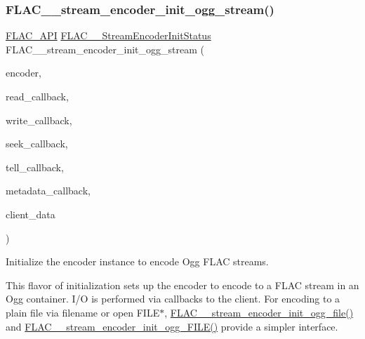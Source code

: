 \subsubsection{\texorpdfstring{FLAC\_\_stream\_encoder\_init\_ogg\_stream()}{FLAC\_\_stream\_encoder\_init\_ogg\_stream()}}
{\footnotesize\ttfamily \mbox{\hyperlink{group__flac__export_ga56ca07df8a23310707732b1c0007d6f5}{F\+L\+A\+C\+\_\+\+A\+PI}} \mbox{\hyperlink{group__flac__stream__encoder_ga3bb869620af2b188d77982a5c30b047d}{F\+L\+A\+C\+\_\+\+\_\+\+Stream\+Encoder\+Init\+Status}} F\+L\+A\+C\+\_\+\+\_\+stream\+\_\+encoder\+\_\+init\+\_\+ogg\+\_\+stream (\begin{DoxyParamCaption}\item[{\mbox{\hyperlink{struct_f_l_a_c_____stream_encoder}{F\+L\+A\+C\+\_\+\+\_\+\+Stream\+Encoder}} $\ast$}]{encoder,  }\item[{\mbox{\hyperlink{group__flac__stream__encoder_ga18b7941b93bae067192732e913536d44}{F\+L\+A\+C\+\_\+\+\_\+\+Stream\+Encoder\+Read\+Callback}}}]{read\+\_\+callback,  }\item[{\mbox{\hyperlink{group__flac__stream__encoder_ga50865125fd57c40fab6eb2f062651429}{F\+L\+A\+C\+\_\+\+\_\+\+Stream\+Encoder\+Write\+Callback}}}]{write\+\_\+callback,  }\item[{\mbox{\hyperlink{group__flac__stream__encoder_ga70b85349d5242e4401c4d8ddf6d9bbca}{F\+L\+A\+C\+\_\+\+\_\+\+Stream\+Encoder\+Seek\+Callback}}}]{seek\+\_\+callback,  }\item[{\mbox{\hyperlink{group__flac__stream__encoder_gabefdf2279e1d0347d9f98f46da4e415b}{F\+L\+A\+C\+\_\+\+\_\+\+Stream\+Encoder\+Tell\+Callback}}}]{tell\+\_\+callback,  }\item[{\mbox{\hyperlink{group__flac__stream__encoder_ga091fbf3340d85bcbda1090c31bc320cf}{F\+L\+A\+C\+\_\+\+\_\+\+Stream\+Encoder\+Metadata\+Callback}}}]{metadata\+\_\+callback,  }\item[{\mbox{\hyperlink{_s_d_l__opengles2__gl2ext_8h_ae5d8fa23ad07c48bb609509eae494c95}{void}} $\ast$}]{client\+\_\+data }\end{DoxyParamCaption})}

Initialize the encoder instance to encode Ogg F\+L\+AC streams.

This flavor of initialization sets up the encoder to encode to a F\+L\+AC stream in an Ogg container. I/O is performed via callbacks to the client. For encoding to a plain file via filename or open {\ttfamily F\+I\+L\+E$\ast$}, \mbox{\hyperlink{group__flac__stream__encoder_ga51eb79f04e9a676cd1ce0c94729252e4}{F\+L\+A\+C\+\_\+\+\_\+stream\+\_\+encoder\+\_\+init\+\_\+ogg\+\_\+file()}} and \mbox{\hyperlink{group__flac__stream__encoder_gab44c7f51a61826e04abd8cdf5c1ceac2}{F\+L\+A\+C\+\_\+\+\_\+stream\+\_\+encoder\+\_\+init\+\_\+ogg\+\_\+\+F\+I\+L\+E()}} provide a simpler interface.

